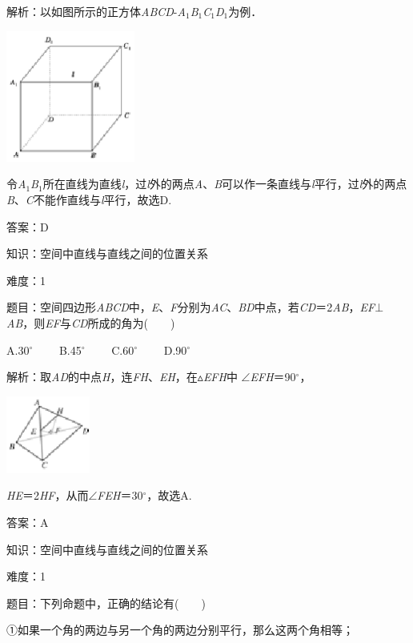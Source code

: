 \documentclass{article} %
\begin{document}
解析：以如图所示的正方体\textit{ABCD}-\textit{A}${}_{1}$\textit{B}${}_{1}$\textit{C}${}_{1}$\textit{D}${}_{1}$为例．

\includegraphics*[width=1.67in, height=1.70in, keepaspectratio=false]{image102}

令\textit{A}${}_{1}$\textit{B}${}_{1}$所在直线为直线\textit{l}，过\textit{l}外的两点\textit{A}、\textit{B}可以作一条直线与\textit{l}平行，过\textit{l}外的两点\textit{B}、\textit{C}不能作直线与\textit{l}平行，故选D.

答案：D

知识：空间中直线与直线之间的位置关系

难度：1

题目：空间四边形\textit{ABCD}中，\textit{E}、\textit{F}分别为\textit{AC}、\textit{BD}中点，若\textit{CD}＝2\textit{AB}，\textit{EF}$\mathrm{\bot}$\textit{AB}，则\textit{EF}与\textit{CD}所成的角为(　　)

A.30$\mathrm{{}^\circ}$　　 B.45$\mathrm{{}^\circ}$　　 C.60$\mathrm{{}^\circ}$　　 D.90$\mathrm{{}^\circ}$

解析：取\textit{AD}的中点\textit{H}，连\textit{FH}、\textit{EH}，在$\mathrm{\vartriangle}$\textit{EFH}中 $\mathrm{\angle}$\textit{EFH}＝90$\mathrm{{}^\circ}$，

\includegraphics*[width=1.09in, height=1.00in, keepaspectratio=false]{image103}

\textit{HE}＝2\textit{HF}，从而$\mathrm{\angle}$\textit{FEH}＝30$\mathrm{{}^\circ}$，故选A.

答案：A

知识：空间中直线与直线之间的位置关系

难度：1

题目：下列命题中，正确的结论有(　　)

①如果一个角的两边与另一个角的两边分别平行，那么这两个角相等；
\end{document}
